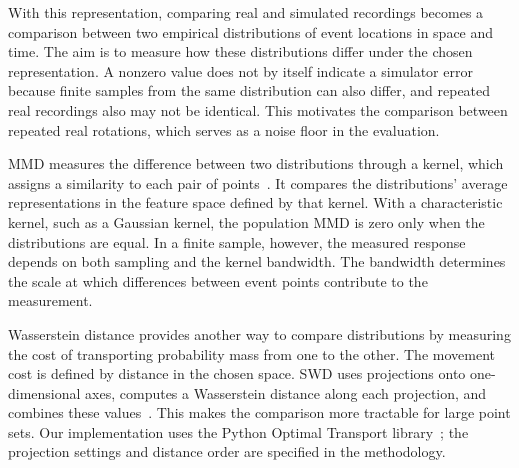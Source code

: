 
With this representation, comparing real and simulated recordings becomes a comparison between two empirical distributions of event locations in space and time. The aim is to measure how these distributions differ under the chosen representation. A nonzero value does not by itself indicate a simulator error because finite samples from the same distribution can also differ, and repeated real recordings also may not be identical. This motivates the comparison between repeated real rotations, which serves as a noise floor in the evaluation. 

MMD measures the difference between two distributions through a kernel, which assigns a similarity to each pair of points~\cite{gretton2012kernel}. It compares the distributions' average representations in the feature space defined by that kernel. With a characteristic kernel, such as a Gaussian kernel, the population MMD is zero only when the distributions are equal. In a finite sample, however, the measured response depends on both sampling and the kernel bandwidth. The bandwidth determines the scale at which differences between event points contribute to the measurement.

Wasserstein distance provides another way to compare distributions by measuring the cost of transporting probability mass from one to the other. The movement cost is defined by distance in the chosen space. SWD uses projections onto one-dimensional axes, computes a Wasserstein distance along each projection, and combines these values~\cite{bonneel2015sliced}. This makes the comparison more tractable for large point sets. Our implementation uses the Python Optimal Transport library~\cite{flamary2021pot}; the projection settings and distance order are specified in the methodology.

